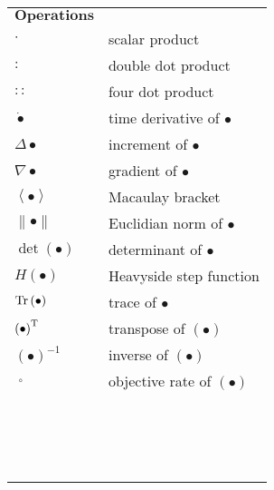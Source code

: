 \begin{table}[htb]
  \centering
    \begin{tabular}{p{3cm}p{10.5cm}}
    $\textbf{Operations}$ & \\
    $\cdot$  & scalar product \\
    $:$  & double dot product \\
    $::$  & four dot product \\
    ${\dot  \bullet }$  & time derivative of $\bullet$ \\
    ${\Delta  \bullet }$  & increment of $\bullet$ \\
    $\nabla \bullet$  & gradient of $\bullet$ \\
    $\left\langle  \bullet  \right\rangle$  & Macaulay bracket \\
    $\left\|  \bullet  \right\|$  & Euclidian norm of $\bullet$ \\
    $\det \left(  \bullet  \right)$  & determinant of $\bullet$ \\
    $H\left(  \bullet  \right)$  & Heavyside step function \\
    $\rm{Tr}\left(  \bullet  \right)$  & trace of $\bullet$ \\
    ${\left(  \bullet  \right)^{\rm T}}$  & transpose of $\left(  \bullet  \right)$ \\
    ${\left(  \bullet  \right)^{ - 1}}$  & inverse of $\left(  \bullet  \right)$ \\
    $\mathop {\left(  \bullet  \right)}\limits^ \circ$  & objective rate of $\left(  \bullet  \right)$ \\
    & \\
    & \\
    & \\
    & \\
    & \\
    & \\
    & \\
    & \\
    & \\
    & \\
    & \\
    & \\
    & \\
    & \\
    & \\
    & \\
    \end{tabular}%
  \label{Tab:operations}%
\end{table}%
\renewcommand\arraystretch{1.0}